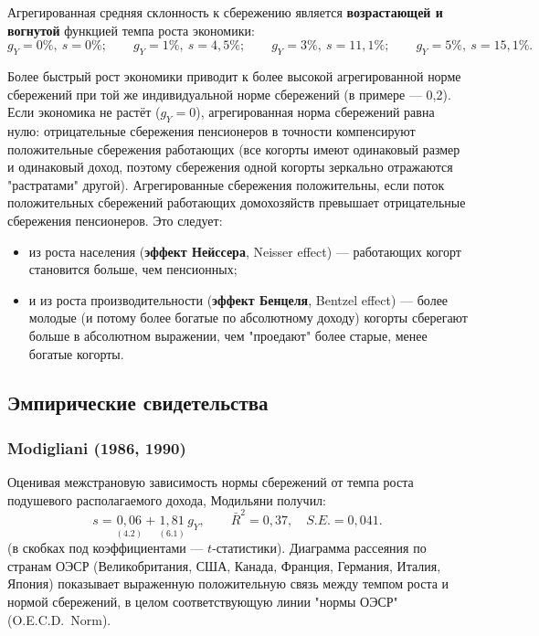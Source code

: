 \documentclass[10pt,a4paper]{article}
\begin{document}
Агрегированная средняя склонность к сбережению является \textbf{возрастающей и вогнутой} функцией темпа роста экономики:
$$g_Y = 0\%,\ s=0\%; \qquad g_Y=1\%,\ s=4{,}5\%; \qquad g_Y=3\%,\ s=11{,}1\%; \qquad g_Y=5\%,\ s=15{,}1\%.$$

\begin{intuition}
Более быстрый рост экономики приводит к более высокой агрегированной норме сбережений при той же индивидуальной норме сбережений (в примере — 0{,}2). Если экономика не растёт ($g_Y=0$), агрегированная норма сбережений равна нулю: отрицательные сбережения пенсионеров в точности компенсируют положительные сбережения работающих (все когорты имеют одинаковый размер и одинаковый доход, поэтому сбережения одной когорты зеркально отражаются "растратами" другой). Агрегированные сбережения положительны, если поток положительных сбережений работающих домохозяйств превышает отрицательные сбережения пенсионеров. Это следует:
\begin{itemize}[leftmargin=1.3em]
\item из роста населения (\textbf{эффект Нейссера}, Neisser effect) — работающих когорт становится больше, чем пенсионных;
\item и из роста производительности (\textbf{эффект Бенцеля}, Bentzel effect) — более молодые (и потому более богатые по абсолютному доходу) когорты сберегают больше в абсолютном выражении, чем "проедают" более старые, менее богатые когорты.
\end{itemize}
\end{intuition}

\subsection{Эмпирические свидетельства}

\subsubsection{Modigliani (1986, 1990)}

Оценивая межстрановую зависимость нормы сбережений от темпа роста подушевого располагаемого дохода, Модильяни получил:
$$s = \underset{(4.2)}{0{,}06} + \underset{(6.1)}{1{,}81}\,g_Y, \qquad \bar R^2 = 0{,}37,\quad S.E.=0{,}041.$$
(в скобках под коэффициентами — $t$-статистики). Диаграмма рассеяния по странам ОЭСР (Великобритания, США, Канада, Франция, Германия, Италия, Япония) показывает выраженную положительную связь между темпом роста и нормой сбережений, в целом соответствующую линии "нормы ОЭСР" (O.E.C.D.\ Norm).
\end{document}
